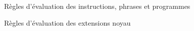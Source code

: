\begin{figure}

\begin{mathpar}

















\end{mathpar}

\caption{Règles d'évaluation des instructions, phrases et programmes}
\end{figure}

\begin{figure}

\begin{mathpar}




\end{mathpar}

\caption{Règles d'évaluation des extensions noyau}
\end{figure}
